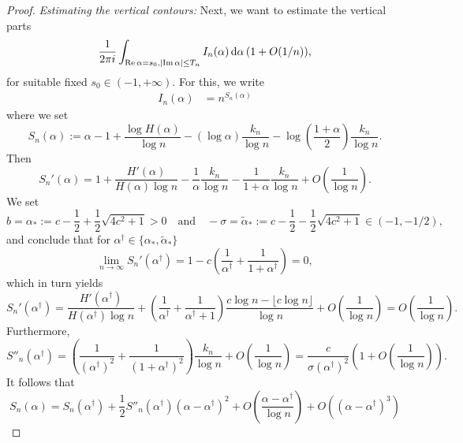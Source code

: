 \documentclass[11pt,a4paper]{article}
\numberwithin{equation}{section}
\newcommand{\dint}{\textup{d}}
\begin{document}
\begin{proof}
\emph{Estimating the vertical contours:}
Next, we want to estimate the vertical parts
\begin{equation*}
    \frac{1}{2\pi i}\int_{\mathrm{Re}\, \alpha=s_0, |\mathrm{Im}\,\alpha|\leq T_n} I_n(\alpha)\, \dint \alpha\, (1+O(1/n)),
\end{equation*}
for suitable fixed $s_0\in (-1,+\infty)$.
For this, we write
    \begin{align*}
        I_n(\alpha)&= n^{S_n(\alpha)}
    \end{align*}
where we set
\begin{equation*}
    S_n(\alpha) := \alpha - 1 + \frac{\log H(\alpha)}{\log n}-(\log \alpha) \frac{k_n}{\log n} - \log\left(\frac{1+\alpha}{2}\right)\frac{k_n}{\log n}.
\end{equation*}
Then
\begin{equation*}
    S_n'(\alpha) = 1 + \frac{H'(\alpha)}{H(\alpha)\log n} - \frac{1}{\alpha} \frac{k_n}{\log n} - \frac{1}{1+\alpha} \frac{k_n}{\log n} + O\left(\frac{1}{\log n}\right).
\end{equation*}
We set
\begin{equation*}
    b=\alpha_* := c-\frac{1}{2}+\frac{1}{2}\sqrt{4c^2+1} >0 \quad \text{and}\quad
    -\sigma=\tilde{\alpha}_* := c-\frac{1}{2}-\frac{1}{2}\sqrt{4c^2+1} \in (-1,-1/2),
\end{equation*}
and conclude that for $\alpha^\dag\in\{\alpha_*,\tilde{\alpha}_*\}$
\begin{equation*}
    \lim_{n\to\infty} S_n'(\alpha^\dag) = 1-c\left(\frac{1}{\alpha^\dag} +\frac{1}{1+\alpha^\dag}\right)=0,
\end{equation*}
which in turn yields
    \begin{equation*}
        S_n'(\alpha^\dag) = \frac{H'(\alpha^\dag)}{H(\alpha^\dag)\log n} + \left(\frac{1}{\alpha^\dag} +\frac{1}{\alpha^\dag+1}\right) \frac{c\log n-\lfloor c\log n\rfloor}{\log n} 
             + O\left(\frac{1}{\log n}\right) 
            = O\left(\frac{1}{\log n}\right).
    \end{equation*}
    Furthermore,
    \begin{equation*}
        S''_n(\alpha^\dag) = \left(\frac{1}{(\alpha^\dag)^2} + \frac{1}{(1+\alpha^\dag)^2}\right) \frac{k_n}{\log n} + O\left(\frac{1}{\log n}\right) 
        = \frac{c}{\sigma(\alpha^\dag)^2} \left(1+ O\left(\frac{1}{\log n}\right)\right).
    \end{equation*}
    It follows that
    \begin{equation*}
        S_n(\alpha) = S_n(\alpha^\dag) + \frac{1}{2} S''_n(\alpha^\dag) (\alpha-\alpha^\dag)^2 + O\left(\frac{\alpha-\alpha^\dag}{\log n}\right) + O((\alpha-\alpha^\dag)^3)

\end{equation*}
\end{proof}
\end{document}
